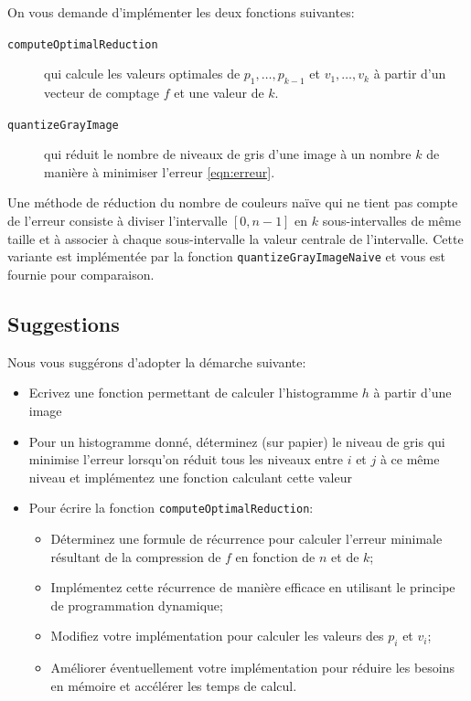 \documentclass[a4paper,10pt]{article}
\begin{document}
On vous demande d'implémenter les deux fonctions suivantes:
\begin{description}
\item[\texttt{computeOptimalReduction}] qui calcule les valeurs optimales de $p_1,\ldots,p_{k-1}$ et $v_1,\ldots,v_k$ à partir d'un vecteur de comptage $f$ et une valeur de $k$.
\item[\texttt{quantizeGrayImage}] qui réduit le nombre de niveaux de gris d'une image à un nombre $k$ de manière à minimiser l'erreur \ref{eqn:erreur}.
\end{description}

Une méthode de réduction du nombre de couleurs naïve qui ne tient pas
compte de l'erreur consiste à diviser l'intervalle $[0,n-1]$ en $k$
sous-intervalles de même taille et à associer à chaque sous-intervalle
la valeur centrale de l'intervalle. Cette variante est implémentée par
la fonction \texttt{quantizeGrayImageNaive} et vous est fournie pour
comparaison.


\subsection*{Suggestions}

Nous vous suggérons d'adopter la démarche suivante:
\begin{itemize}
\item Ecrivez une fonction permettant de calculer l'histogramme $h$ à
  partir d'une image
\item Pour un histogramme donné, déterminez (sur papier) le niveau de gris qui minimise l'erreur lorsqu'on réduit tous les niveaux entre $i$ et $j$ à ce même niveau et implémentez une fonction calculant cette valeur
\item Pour écrire la fonction \texttt{computeOptimalReduction}:
\begin{itemize}
\item Déterminez une formule de récurrence pour calculer l'erreur minimale résultant de la compression de $f$ en fonction de $n$ et de $k$;
\item Implémentez cette récurrence de manière efficace en utilisant le principe de programmation dynamique;
\item Modifiez votre implémentation pour calculer les valeurs des $p_i$ et $v_i$;
\item Améliorer éventuellement votre implémentation pour réduire les
  besoins en mémoire et accélérer les temps de calcul.
\end{itemize}
\end{itemize}
\end{document}
